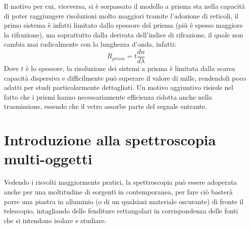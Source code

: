 Il motivo per cui, viceversa, si è sorpassato il modello a prisma sta nella capacità di poter raggiungere risoluzioni molto maggiori tramite l'adozione di reticoli, il primo sistema è infatti limitato dallo spessore del prisma (più è spesso maggiore la rifrazione), ma soprattutto dalla derivata dell'indice di rifrazione, il quale non cambia mai radicalmente con la lunghezza d'onda, infatti:
\begin{equation*}
    R_{prism}=t\frac{dn}{d\lambda}
\end{equation*}
Dove $t$ è lo spessore, la risoluzione dei sistemi a prisma è limitata dalla scarsa capacità dispersiva e difficilmente può superare il valore di mille, rendendoli poco adatti per studi particolarmente dettagliati. Un motivo aggiuntivo risiede nel fatto che i prismi hanno necessariamente efficienza ridotta anche nella trasmissione, essendo che il vetro assorbe parte del segnale entrante.

\section{Introduzione alla spettroscopia multi-oggetti}

Vedendo i risvolti maggiormente pratici, la spettroscopia può essere adoperata anche per una moltitudine di sorgenti in contemporanea, per fare ciò basterà porre una piastra in alluminio (o di un qualsiasi materiale oscurante) di fronte il telescopio, intagliando delle fenditure rettangolari in corrispondenza delle fonti che si intendono isolare e studiare.